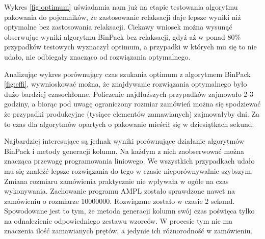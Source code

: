 Wykres \ref{fig:optimum} uświadamia nam już na etapie testowania algorytmu pakowania do pojemników, że zastosowanie relaksacji daje lepsze wyniki niż optymalne bez zastosowania relaksacji. Ciekawy wniosek można wysunąć obserwując wyniki algorytmu BinPack bez relaksacji, gdyż aż w ponad 80\% przypadków testowych wyznaczył optimum, a przypadki w których mu się to nie udało, nie odbiegały znacząco od rozwiązania optymalnego.

Analizując wykres porównujący czas szukania optimum z algorytmem BinPack \ref{fig:effi}, wywnioskować można, że znajdywanie rozwiązania optymalnego było dużo bardziej czasochłonne. Policzenie najdłuższych przypadków zajmowało 2-3 godziny, a biorąc pod uwagę ograniczony rozmiar zamówień można się spodziewać że przypadki produkcyjne (tysiące elementów zamawianych) zajmowałyby dni. Za to czas dla algorytmów opartych o pakowanie mieścił się w dziesiątkach sekund.

Najbardziej interesujące są jednak wyniki porównujące działanie algorytmów BinPack i metody generacji kolumn. Na każdym z nich zaobserwować można znacząca przewagę programowania liniowego. We wszystkich przypadkach udało mu się znaleźć lepsze rozwiązania do tego w czasie nieporównywalnie szybszym. Zmiana rozmiaru zamówienia praktycznie nie wpływała w ogóle na czas wykonywania. Zachowanie programu AMPL zostało sprawdzone nawet na zamówieniu o rozmiarze 10000000. Rozwiązane zostało w czasie 2 sekund. Spowodowane jest to tym, że metoda generacji kolumn swój czas poświęca tylko na odnalezienie odpowiedniego zestawu wzorców. W procesie tym nie ma znaczenia ilość zamawianych prętów, a jedynie ich różnorodność w zamówieniu. 